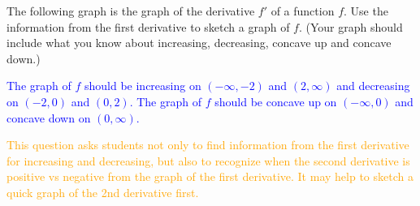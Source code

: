 \documentclass{ximera}
\begin{document}
\begin{exercise}
    The following graph is the graph of the derivative $f'$ of a function $f$.  Use the information from the first derivative to sketch a graph of $f$. (Your graph should include what you know about increasing, decreasing, concave up and concave down.)\\
    \begin{image} 
    \end{image}
    \textcolor{blue}{The graph of $f$ should be increasing on $(-\infty,-2)$ and $(2,\infty)$ and decreasing on $(-2,0)$ and $(0,2)$.  The graph of $f$ should be concave up on $(-\infty,0)$ and concave down on $(0,\infty)$.  
    \begin{image} 
    \end{image}
    }    
    \textcolor{orange}{This question asks students not only to find information from the first derivative for increasing and decreasing, but also to recognize when the second derivative is positive vs negative from the graph of the first derivative.  It may help to sketch a quick graph of the 2nd derivative first.}
\end{exercise}
\end{document}
